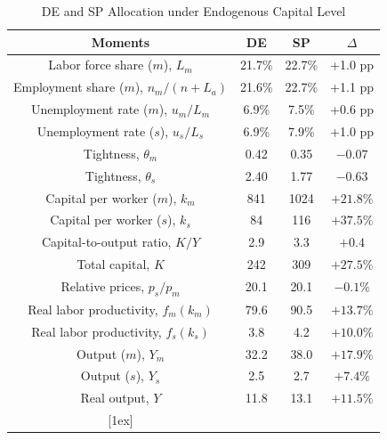 \documentclass[12pt]{article} %
\theoremstyle{definition}
\begin{document}
\begin{table}[H]
 \caption{DE and SP  Allocation under Endogenous Capital Level} \label{DE_SP}
\centering

 \begin{tabular}{||c c c c||} 
 \hline
 \textbf{Moments} & \textbf{DE} & \textbf{SP}  & $\Delta$ \\  
 \hline\hline
  Labor force share ($m$), $L_m$ & 21.7\%  & 22.7\% & +1.0  pp \\
  Employment share ($m$), $n_m/(n+L_a)$ & 21.6\% & 22.7\%  & +1.1 pp \\
  Unemployment rate ($m$), $u_m/L_m$ & 6.9\% & 7.5\% & +0.6 pp  \\ 
   Unemployment rate ($s$),  $u_s/L_s$ & 6.9\% & 7.9\% & +1.0 pp \\ 
    Tightness, $\theta_m$ & 0.42 & 0.35  & $-0.07$ \\
  Tightness, $\theta_s$ & 2.40 & 1.77  & $-0.63$ \\
   Capital per worker ($m$), $k_m$ & 841 &  1024  & $ +21.8\%$ \\ 
      Capital per worker ($s$), $k_s$ & 84 &  116  & $ +37.5\%$ \\ 
  Capital-to-output ratio, $K/Y$ & 2.9 & 3.3    &   $+0.4$\\
  Total capital,  $K$  & 242  & 309 & $ + 27.5\% $\\
  Relative prices, $p_s/p_m$ & 20.1  &  20.1  &  $-0.1\%$ \\
  Real labor productivity, $f_m(k_m)$ & 79.6 & 90.5 & $+13.7\% $\\ 
Real labor productivity, $f_s(k_s)$ & 3.8 & 4.2 & $+10.0\% $\\ 
Output ($m$), $Y_m$  & 32.2 & 38.0 & $+17.9\%$ \\
Output ($s$), $Y_s$  & 2.5 & 2.7 & $+7.4\%$ \\
 Real output, $Y$ &  11.8   &  13.1 & $+11.5\%$ \\
 [1ex] 
 \hline
 \end{tabular}
 
\end{table} 
\end{document}

